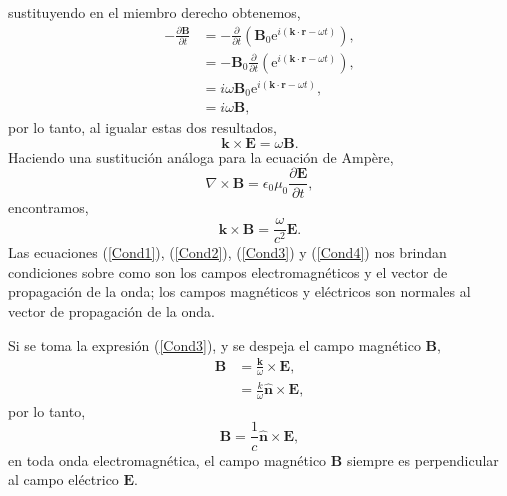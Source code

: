 \documentclass[11pt,fleqn]{book} %
\begin{document}
sustituyendo en el miembro derecho obtenemos,
\begin{equation*}
\begin{split}
-\frac{\partial \textbf{B}}{\partial t}&=-\frac{\partial}{\partial t}\left( \textbf{B}_0\text{e}^{i(\textbf{k}\cdot\textbf{r}- \omega t)} \right),\\
&=-\textbf{B}_0 \frac{\partial}{\partial t}\left( \text{e}^{i(\textbf{k}\cdot\textbf{r}- \omega t)} \right),\\
&= i \omega\textbf{B}_0\text{e}^{i(\textbf{k}\cdot\textbf{r}- \omega t)} ,\\
&= i \omega\textbf{B},
\end{split}
\end{equation*}
por lo tanto, al igualar estas dos resultados,
\begin{equation} \label{Cond3}
 \textbf{k}\times\textbf{E}=\omega\textbf{B}.
\end{equation}
Haciendo una sustituci\'on an\'aloga para la ecuaci\'on de Amp\`ere,
\begin{equation*}
\nabla\times\textbf{B}=\epsilon_0\mu_0\frac{\partial \textbf{E}}{\partial t},
\end{equation*}
encontramos,
\begin{equation} \label{Cond4}
 \textbf{k}\times\textbf{B}=\frac{\omega}{c^2}\textbf{E}.
\end{equation}
Las ecuaciones (\ref{Cond1}), (\ref{Cond2}), (\ref{Cond3}) y (\ref{Cond4}) nos brindan condiciones sobre como son los campos electromagn\'eticos
y el vector de propagaci\'on de la onda; los campos magn\'eticos y el\'ectricos son normales al vector de propagaci\'on de la onda.

\begin{obs}
 Si se toma la expresi\'on (\ref{Cond3}), y se despeja el campo magn\'etico $\textbf{B}$,
 \begin{equation*}
 \begin{split}
 \textbf{B}&=\frac{\textbf{k}}{\omega}\times\textbf{E},\\
&=\frac{k}{\omega}\hat{\textbf{n}}\times\textbf{E},
 \end{split}
 \end{equation*}
por lo tanto,
\begin{equation} \label{tranver}
 \textbf{B}=\frac{1}{c}\hat{\textbf{n}}\times\textbf{E},
\end{equation}
en toda onda electromagn\'etica, el campo magn\'etico $\textbf{B}$ siempre es perpendicular al campo el\'ectrico $\textbf{E}$.
\end{obs}
\end{document}
